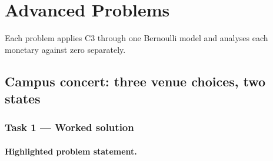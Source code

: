 \section{Advanced Problems}\label{sec:t2-c3-advanced}
Each problem applies C3 through one Bernoulli model and analyses each monetary  against zero separately.
\subsection{Campus concert: three venue choices, two states}\label{prob:c3-restaurant}
\CThreePlain{\CThreeStatementRestaurant}
\subsubsection*{Task 1 --- Worked solution}\label{sol:c3-restaurant-model}
\paragraph{Highlighted problem statement.}
\CThreeStatementRestaurant
\CThreeTaskOne

